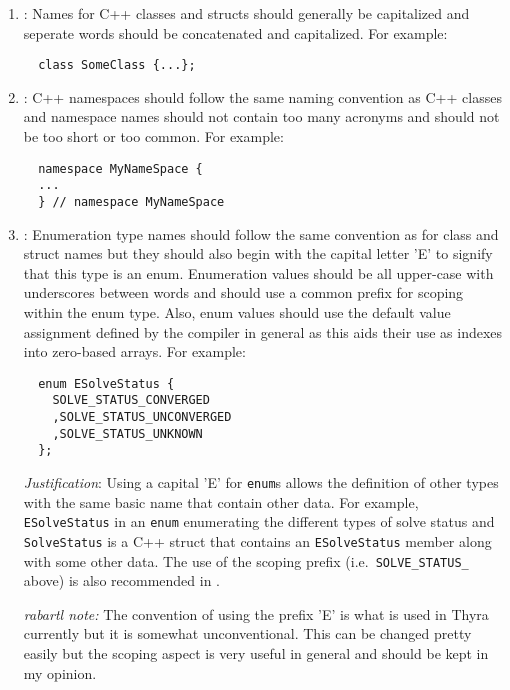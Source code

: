 \begin{enumerate}

{}\item\NCClassNames: Names for C++ classes and structs should generally be
capitalized and seperate words should be concatenated and capitalized.  For
example:

{\small\begin{verbatim}
  class SomeClass {...};
\end{verbatim}}

{}\item\NCNamespaceNames: C++ namespaces should follow the same naming convention
as C++ classes and namespace names should not contain too many acronyms and
should not be too short or too common.  For example:

{\small\begin{verbatim}
  namespace MyNameSpace {
  ...
  } // namespace MyNameSpace 
\end{verbatim}}

{}\item\NCEnumNames: Enumeration type names should follow the same convention as
for class and struct names but they should also begin with the capital letter
'E' to signify that this type is an enum.  Enumeration values should be all
upper-case with underscores between words and should use a common prefix for
scoping within the enum type.  Also, enum values should use the default value
assignment defined by the compiler in general as this aids their use as
indexes into zero-based arrays.  For example:

{\small\begin{verbatim}
  enum ESolveStatus {
    SOLVE_STATUS_CONVERGED
    ,SOLVE_STATUS_UNCONVERGED
    ,SOLVE_STATUS_UNKNOWN
  };
\end{verbatim}}

{}\textit{Justification}: Using a capital 'E' for {}\texttt{enum}s allows the
definition of other types with the same basic name that contain other data.
For example, {}\texttt{ESolveStatus} in an {}\texttt{enum} enumerating the
different types of solve status and {}\texttt{SolveStatus} is a C++ struct
that contains an {}\texttt{ESolveStatus} member along with some other data.
The use of the scoping prefix (i.e.\ {}\texttt{SOLVE\-\_STATUS\_} above) is
also recommended in {}\cite[Section 11.4]{CodeComplete2nd04}.

{}\textit{rabartl note:} The convention of using the prefix 'E' is what is
used in Thyra currently but it is somewhat unconventional.  This can be
changed pretty easily but the scoping aspect is very useful in general and
should be kept in my opinion.


\end{enumerate}
